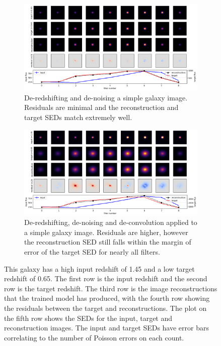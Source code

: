 \documentclass[fleqn,usenatbib]{mnras}
\begin{document}
\begin{figure}

    \begin{subfigure}[b]{2\columnwidth}
        \centering
	    \includegraphics[width=\columnwidth]{Figures/noisy-high-noiseless-low.png}
        \caption{De-redshifting and de-noising a simple galaxy image. Residuals are minimal and the reconstruction and target SEDs match extremely well.}
        \label{fig:noisy-high-noiseless-low}
    \end{subfigure}
    
    \begin{subfigure}[b]{2\columnwidth}
        \centering
	    \includegraphics[width=\columnwidth]{Figures/noisy-high-standard-low.png}
        \caption{De-redshifting, de-noising and de-convolution applied to a simple galaxy image. Residuals are higher, however the reconstruction SED still falls within the margin of error of the target SED for nearly all filters.}
        \label{fig:noisy-high-standard-low}
    \end{subfigure}
    
    \caption{This galaxy has a high input redshift of 1.45 and a low target redshift of 0.65. The first row is the input redshift and the second row is the target redshift. The third row is the image reconstructions that the trained model has produced, with the fourth row showing the residuals between the target and reconstructions. The plot on the fifth row shows the SEDs for the input, target and reconstruction images. The input and target SEDs have error bars correlating to the number of Poisson errors on each count. }
    \label{fig:simple galaxy results plots de-noise}

\end{figure}
\end{document}
